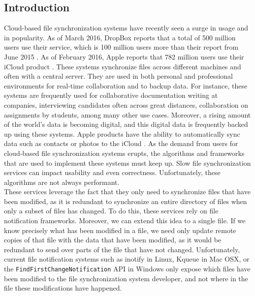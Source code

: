 \documentclass[table]{article}
\newcommand{\code}[1]{\texttt{#1}}
\begin{document}
\begin{multicols}{2}
\section{Introduction}

Cloud-based file synchronization systems have recently seen a surge in usage and in popularity. As of March 2016, DropBox reports that a total of 500 million users \cite{dropbox-500} use their service, which is 100 million users more than their report from June 2015 \cite{dropbox-400}. As of February 2016, Apple reports that 782 million users use their iCloud product \cite{apple-782}. These systems synchronize files across different machines and often with a central server. They are used in both personal and professional environments for real-time collaboration and to backup data. For instance, these systems are frequently used for collaborative documentation writing at companies, interviewing candidates often across great distances, collaboration on assignments by students, among many other use cases. Moreover, a rising amount of the world's data is becoming digital, and this digital data is frequently backed up using these systems. Apple products have the ability to automatically sync data such as contacts or photos to the iCloud \cite{icloud-sync}. As the demand from users for cloud-based file synchronization systems erupts, the algorithms and frameworks that are used to implement these systems must keep up. Slow file synchronization services can impact usability and even correctness. Unfortunately, these algorithms are not always performant.\\

These services leverage the fact that they only need to synchronize files that have been modified, as it is redundant to synchronize an entire directory of files when only a subset of files has changed. To do this, these services rely on file notification frameworks. Moreover, we can extend this idea to a single file. If we know precisely what has been modified in a file, we need only update remote copies of that file with the data that have been modified, as it would be redundant to send over parts of the file that have not changed. Unfortunately, current file notification systems such as inotify \cite{inotify} in Linux, Kqueue \cite{kqueue} in Mac OSX, or the \code{FindFirstChangeNotification} API \cite{windows} in Windows only expose which files have been modified to the file synchronization system developer, and not where in the file these modifications have happened.\\


\end{multicols}
\end{document}
